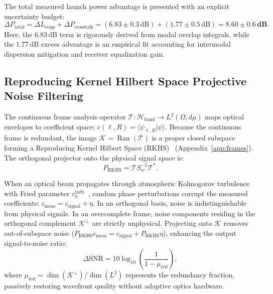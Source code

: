 \documentclass[11pt,a4paper]{article}
\begin{document}
The total measured launch power advantage is presented with an explicit uncertainty budget:
\begin{equation}
\Delta P_{\text{total}} = \Delta L_{\text{coup}} + \Delta P_{\text{crosstalk}} = (6.83 \pm 0.3\,\text{dB}) + (1.77 \pm 0.5\,\text{dB}) = \mathbf{8.60 \pm 0.6\,\text{dB}}.
\label{eq:total_power_advantage_86db}
\end{equation}
Here, the $6.83\,\text{dB}$ term is rigorously derived from modal overlap integrals, while the $1.77\,\text{dB}$ excess advantage is an empirical fit accounting for intermodal dispersion mitigation and receiver equalization gain.

\subsection{Reproducing Kernel Hilbert Space Projective Noise Filtering}

The continuous frame analysis operator $\mathcal{T}: \mathcal{H}_{\text{band}} \to L^2(\Omega, d\mu)$ maps optical envelopes to coefficient space: $c(\ell, R) = \langle \psi_{\ell, R} | \psi \rangle$. Because the continuous frame is redundant, the image $\mathcal{K} = \operatorname{Ran}(\mathcal{T})$ is a proper closed subspace forming a Reproducing Kernel Hilbert Space (RKHS)~\cite{PaulsenRaghupathi2016} (Appendix~\ref{app:frames}). The orthogonal projector onto the physical signal space is:
\begin{equation}
\boxed{P_{\text{RKHS}} = \mathcal{T} S_w^{-1} \mathcal{T}^*.}
\label{eq:rkhs_projector}
\end{equation}

When an optical beam propagates through atmospheric Kolmogorov turbulence with Fried parameter $r_0^{\text{turb}}$~\cite{Kolmogorov1941,Fried1966,Noll1976,Paterson2005,TylerBoyd2009}, random phase perturbations corrupt the measured coefficients: $c_{\text{meas}} = c_{\text{signal}} + \eta$. In an orthogonal basis, noise is indistinguishable from physical signals. In an overcomplete frame, noise components residing in the orthogonal complement $\mathcal{K}^\perp$ are strictly unphysical. Projecting onto $\mathcal{K}$ removes out-of-subspace noise ($P_{\text{RKHS}} c_{\text{meas}} = c_{\text{signal}} + P_{\text{RKHS}} \eta$), enhancing the output signal-to-noise ratio:
\begin{equation}
\Delta \text{SNR} = 10 \log_{10}\left( \frac{1}{1 - \mu_{\text{red}}} \right),
\label{eq:snr_gain_formula}
\end{equation}
where $\mu_{\text{red}} = \operatorname{dim}(\mathcal{K}^\perp) / \operatorname{dim}(L^2)$ represents the redundancy fraction, passively restoring wavefront quality without adaptive optics hardware.
\end{document}
